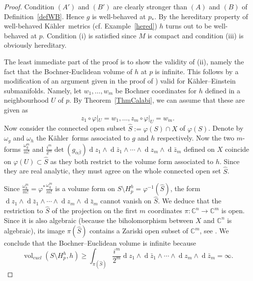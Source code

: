 \documentclass[12pt]{amsart}
\newcommand{\C}{\mathbb{C}}
\newcommand{\K}{K\"{a}hler}
\newcommand{\di}{{\operatorname{d}}}
\newcommand{\vol}{{\operatorname{vol}}}
\newcommand{\lra}{\longrightarrow}
\begin{document}
\begin{proof}
	Condition $(A')$ and $(B')$ are clearly  stronger than $(A)$ and $(B)$ of Definition~\ref{defWB}. 
	Hence $g$ is well-behaved at $p_*$. 
	By the hereditary property of well-behaved \K\ metrics (cf. Example~\ref{hered}) $h$ turns out to be well-behaved at $p$. 
	Condition (i) is satisfied since $M$ is compact and condition (iii) is obviously hereditary.
	
	The least immediate part of the proof is to show the validity of (ii), namely the fact that the Bochner-Euclidean volume of $h$ at $p$ is infinite. 
	This follows by a modification of an argument given in the proof of \cite[Proposition 2.3]{ArezzoLoiZuddas16Toric}) valid for \K--Einstein submanifolds.
	Namely, let $w_1,\ldots,w_m$ be Bochner coordinates for $h$ defined in a neighbourhood $U$ of $p$.
	By Theorem~\ref{ThmCalabi}, we can assume that these are given as
		\begin{equation*}
		z_1\circ \varphi |_{U}=w_1,\dots , z_m\circ \varphi |_{U}=w_m.
		\end{equation*}
	Now consider the connected open subset $\hat{S}:=\varphi(S)\cap X$ of $\varphi(S)$. Denote by $\omega_g$ and $\omega_h$ the \K\ forms  associated to $g$ and $h$ respectively. 
	Now the two $m$-forms $\frac{\omega_g^m}{m!}$ and $\frac{i^m}{2^m}\det(g_{\alpha\bar\beta})\di z_1\wedge\di \bar z_1\wedge\cdots\wedge\di z_m\wedge\di \bar z_m$ defined on $X$ coincide on $\varphi(U)\subset\hat S$ as they both restrict to the volume form associated to $h$.
	Since they are real analytic, they must agree on the whole connected open set $\hat{S}$.
	
	Since $\frac{\omega_h^m}{m!}=\varphi^{*} \frac{\omega_g^m}{m!}$ is a volume form on $S\setminus H^h_p=\varphi^{-1}(\hat S)$, the form $\di z_1\wedge\di \bar z_1\wedge\cdots\wedge\di z_m\wedge\di \bar z_m$ cannot vanish on $\hat S$.
	We deduce that the restriction to $\hat{S}$ of the projection on the first $m$ coordinates $\pi:\C^n\lra\C^m$  is open. 
	Since it is also algebraic (because the biholomorphism between $X$ and $\C^n$ is algebraic), its image $\pi(\hat{S})$ contains a Zariski open subset of $\C^m$, see \cite[Theorem~13.2]{Borel91LinearGroups}.
	We conclude that the Bochner--Euclidean volume is infinite because
	$$  \vol_{eucl} (S\setminus H^h_p, h)\geq\int_{\pi(\hat{S})}\dfrac{i^m}{2^m}\di z_1\wedge\di \bar z_1\wedge\cdots\wedge\di z_m\wedge\di \bar z_m=\infty.$$
\end{proof}
\end{document}
